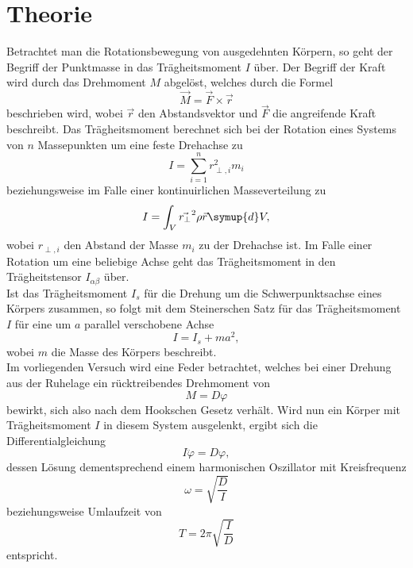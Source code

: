 \section{Theorie}
\label{sec:Theorie}
Betrachtet man die Rotationsbewegung von ausgedehnten Körpern, so geht der Begriff der Punktmasse in das Trägheitsmoment $I$ über.
Der Begriff der Kraft wird durch das Drehmoment $M$ abgelöst, welches durch die Formel
\begin{equation}
  \vec{M} = \vec{F} \times \vec{r}
\end{equation}
beschrieben wird, wobei $\vec{r}$ den Abstandsvektor und $\vec{F}$ die angreifende Kraft beschreibt.
Das Trägheitsmoment berechnet sich bei der Rotation eines Systems von $n$ Massepunkten um eine feste Drehachse zu
\begin{equation}
  I = \sum_{i=1}^n r_{\perp, i}^2 m_i
  \label{eqn:tm1}
\end{equation}
beziehungsweise im Falle einer kontinuirlichen Masseverteilung zu
\begin{equation}
  I = \int_V^{} \vec{r_{\perp}}^2 \rho{\vec{r}} \symup{d}V,
  \label{eqn:tm2}
\end{equation}
wobei $r_{\perp, i}$ den Abstand der Masse $m_i$ zu der Drehachse ist.
Im Falle einer Rotation um eine beliebige Achse geht das Trägheitsmoment in den Trägheitstensor $I_{\alpha \beta}$ über.\\
Ist das Trägheitsmoment $I_s$ für die Drehung um die Schwerpunktsachse eines Körpers zusammen, so folgt mit dem Steinerschen Satz für das Trägheitsmoment $I$ für eine um $a$ parallel verschobene Achse
\begin{equation}
  I = I_s + m a^2,
  \label{eqn:steiner}
\end{equation}
wobei $m$ die Masse des Körpers beschreibt.\\
Im vorliegenden Versuch wird eine Feder betrachtet, welches bei einer Drehung aus der Ruhelage ein rücktreibendes Drehmoment von
\begin{equation}
  M = D \varphi
\end{equation}
bewirkt, sich also nach dem Hookschen Gesetz verhält.
Wird nun ein Körper mit Trägheitsmoment $I$ in diesem System ausgelenkt, ergibt sich die Differentialgleichung
\begin{equation}
  I \ddot{\varphi} = D \varphi,
\end{equation}
dessen Lösung dementsprechend einem harmonischen Oszillator mit Kreisfrequenz
\begin{equation}
  \omega = \sqrt{\frac{D}{I}}
\end{equation}
beziehungsweise Umlaufzeit von
\begin{equation}
  T = 2 \pi \sqrt{\frac{I}{D}} \label{eqn:zeiten}
\end{equation}
entspricht.

